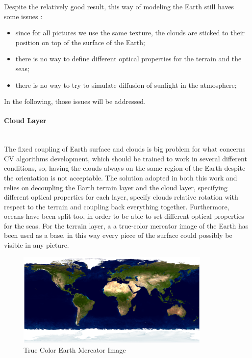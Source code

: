 Despite the relatively good result, this way of modeling the Earth still haves some issues :
\begin{itemize}
  \item since for all pictures we use the same texture, the clouds are sticked to their position on top of the surface of the Earth;
  \item there is no way to define different optical properties for the terrain and the seas;
  \item there is no way to try to simulate diffusion of sunlight in the atmosphere;
\end{itemize}
In the following, those issues will be addressed.

\paragraph{Cloud Layer}\mbox{}\\
The fixed coupling of Earth surface and clouds is big problem for what concerns CV algorithms development, which should be trained to work in several different conditions, so, having the clouds always on the same region of the Earth despite the orientation is not acceptable.
The solution adopted in both this work and \cite{jacopo} relies on decoupling the Earth terrain layer and the cloud layer, specifying different optical properties for each layer, specify clouds relative rotation with respect to the terrain and coupling back everything together.
Furthermore, oceans have been split too, in order to be able to set different optical properties for the seas.
For the terrain layer, a a true-color mercator image of the Earth has been used as a base, in this way every piece of the surface could possibly be visible in any picture.

\begin{figure}[htbp]
  \centering
  \includegraphics[width=0.85\textwidth]{gfx/earthMercator.eps}
  \caption{True Color Earth Mercator Image \cite{bluemarble}}
  \label{fig:EarthMercator}
\end{figure}

